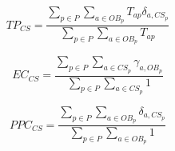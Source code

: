 \documentclass[12pt,a4paper]{article}
\begin{document}
\begin{equation} \label{eq:tripcoverage}
TP_{CS} = \frac{\sum_{p \in P} \sum_{a \in OB_{p}} T_{ap}\delta_{a,CS_{p}}}{\sum_{p \in P} \sum_{a \in OB_{p}} T_{ap}}
\end{equation}

\begin{equation} \label{eq:efficientcoverage}
EC_{CS} = \frac{\sum_{p \in P} \sum_{a \in CS_{p}} \gamma_{a,OB_{p}}}{\sum_{p \in P} \sum_{a \in CS_{p}} 1}
\end{equation}

\begin{equation} \label{eq:passengerpathcoverage}
PPC_{CS} = \frac{\sum_{p \in P} \sum_{a \in OB_{p}} \delta_{a,CS_{p}}}{\sum_{p \in P} \sum_{a \in OB_{p}} 1}
\end{equation}
\end{document}
